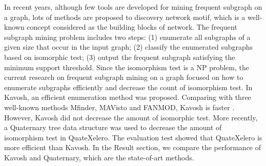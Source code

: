 \documentclass[9pt,oneside]{article}
\begin{document}
In recent years, although few tools are developed for mining frequent subgraph on a graph, lots of methods are proposed to discovery network motif\cite{mangan2003structure,wernicke2006fanmod,chen2006nemofinder,wong2012biological}, which is a well-known concept considered as the building blocks of network. The frequent subgraph mining problem includes two steps: (1) enumerate all subgraphs of a given size that occur in the input graph; (2) classify the enumerated subgraphs based on isomorphic test; (3) output the frequent subgraph satisfying the minimum support threshold. Since the isomorphism test is a NP problem, the current research on frequent subgraph mining on a graph focused on how to enumerate subgraphs efficiently and decrease  the count of isomorphism test. In Kavosh, an efficient enumeration method was proposed. Comparing with three well-known methods Mfinder\cite{kashtan2004efficient}, MAVisto\cite{schreiber2005mavisto} and FANMOD\cite{wernicke2006fanmod}, Kavosh is faster \cite{kashani2009kavosh}.  However, Kavosh did not decrease the amount of isomorphic test. More recently, a Quaternary tree data structure was used to decrease the amount of isomorphism test in QuateXelero. The evaluation test showed that QuateXelero is more efficient than Kavosh\cite{khakabimamaghani2013quatexelero}. In the Result section, we compare the performance of Kavosh and Quaternary, which are the state-of-art methods. 

\end{document}
